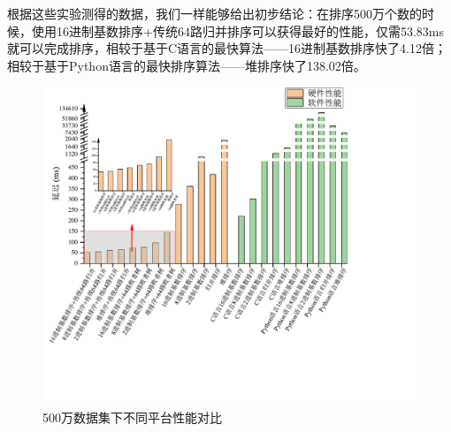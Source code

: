 根据这些实验测得的数据，我们一样能够给出初步结论：在排序500万个数的时候，使用16进制基数排序+传统64路归并排序可以获得最好的性能，仅需53.83ms就可以完成排序，相较于基于C语言的最快算法——16进制基数排序快了4.12倍；相较于基于Python语言的最快排序算法——堆排序快了138.02倍。

\begin{figure}[htbp]
    \centering
    \includegraphics[width=\linewidth]{figures/5MComparison.pdf}
    \caption{500万数据集下不同平台性能对比}
    \label{fig:5MComparison}
\end{figure}


\begin{table}[htbp]
\centering
\caption{500万级别数据集软件性能测试}
\label{tab:5Msoftware}
\end{table}



